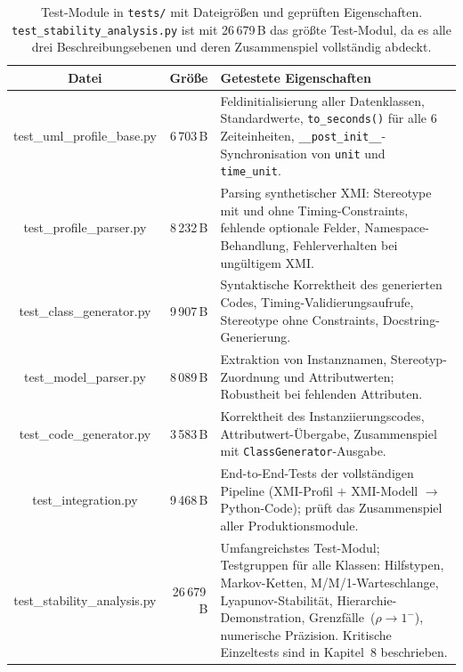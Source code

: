 ﻿\documentclass[a4paper,12pt]{report}
\theoremstyle{definition}
\begin{document}
\begin{table}[H]
	\small
	\centering
	\renewcommand{\arraystretch}{1.35}
	\begin{tabular}{@{} C r p{6.4cm} @{}}
		\toprule
		\normalfont\textbf{Datei} &
		\textbf{Größe} &
		\textbf{Getestete Eigenschaften} \\
		\midrule
		test\_uml\_profile\_base.py  & 6\,703\,B &
		Feldinitialisierung aller Datenklassen, Standardwerte,
		\texttt{to\_seconds()} für alle 6 Zeiteinheiten,
		\texttt{\_\_post\_init\_\_}-Synchronisation von
		\texttt{unit} und \texttt{time\_unit}. \\
		
		test\_profile\_parser.py     & 8\,232\,B &
		Parsing synthetischer XMI: Stereotype mit und ohne
		Timing-Constraints, fehlende optionale Felder,
		Namespace-Behandlung, Fehlerverhalten bei ungültigem XMI. \\
		
		test\_class\_generator.py    & 9\,907\,B &
		Syntaktische Korrektheit des generierten Codes,
		Timing-Validierungsaufrufe, Stereotype ohne Constraints,
		Docstring-Generierung. \\
		
		test\_model\_parser.py       & 8\,089\,B &
		Extraktion von Instanznamen, Stereotyp-Zuordnung und
		Attributwerten; Robustheit bei fehlenden Attributen. \\
		
		test\_code\_generator.py     & 3\,583\,B &
		Korrektheit des Instanziierungscodes,
		Attributwert-Übergabe, Zusammenspiel mit
		\texttt{ClassGenerator}-Ausgabe. \\
		
		test\_integration.py         & 9\,468\,B &
		End-to-End-Tests der vollständigen Pipeline
		(XMI-Profil $+$ XMI-Modell $\to$ Python-Code);
		prüft das Zusammenspiel aller Produktionsmodule. \\
		
		test\_stability\_analysis.py & 26\,679\,B &
		Umfangreichstes Test-Modul; Testgruppen für alle Klassen:
		Hilfstypen, Markov-Ketten, M/M/1-Warteschlange,
		Lyapunov-Stabilität, Hierarchie-Demonstration,
		Grenzfälle~($\rho \to 1^{-}$), numerische Präzision.
		Kritische Einzeltests sind in Kapitel~8 beschrieben. \\
		\bottomrule
	\end{tabular}
	\caption{Test-Module in \texttt{tests/} mit Dateigrößen und
		geprüften Eigenschaften.
		\texttt{test\_stability\_analysis.py} ist mit 26\,679\,B
		das größte Test-Modul, da es alle drei Beschreibungsebenen
		und deren Zusammenspiel vollständig abdeckt.}
\label{tab:test-module}
	\label{tab:module-tests}
\end{table}
\end{document}
